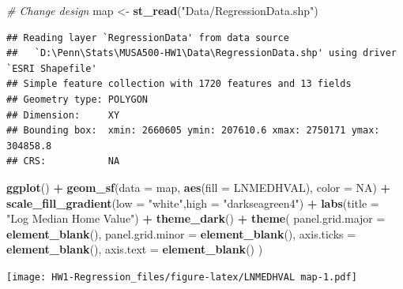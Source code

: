 \documentclass[
]{article}
\newenvironment{Shaded}{\begin{snugshade}}{\end{snugshade}}
\newcommand{\AttributeTok}[1]{\textcolor[rgb]{0.13,0.29,0.53}{#1}}
\newcommand{\CommentTok}[1]{\textcolor[rgb]{0.56,0.35,0.01}{\textit{#1}}}
\newcommand{\ConstantTok}[1]{\textcolor[rgb]{0.56,0.35,0.01}{#1}}
\newcommand{\FunctionTok}[1]{\textcolor[rgb]{0.13,0.29,0.53}{\textbf{#1}}}
\newcommand{\NormalTok}[1]{#1}
\newcommand{\OtherTok}[1]{\textcolor[rgb]{0.56,0.35,0.01}{#1}}
\newcommand{\SpecialCharTok}[1]{\textcolor[rgb]{0.81,0.36,0.00}{\textbf{#1}}}
\newcommand{\StringTok}[1]{\textcolor[rgb]{0.31,0.60,0.02}{#1}}
\begin{document}
\begin{Shaded}
\begin{Highlighting}[]
\CommentTok{\# Change design}
\NormalTok{map }\OtherTok{\textless{}{-}} \FunctionTok{st\_read}\NormalTok{(}\StringTok{"Data/RegressionData.shp"}\NormalTok{)}
\end{Highlighting}
\end{Shaded}

\begin{verbatim}
## Reading layer `RegressionData' from data source 
##   `D:\Penn\Stats\MUSA500-HW1\Data\RegressionData.shp' using driver `ESRI Shapefile'
## Simple feature collection with 1720 features and 13 fields
## Geometry type: POLYGON
## Dimension:     XY
## Bounding box:  xmin: 2660605 ymin: 207610.6 xmax: 2750171 ymax: 304858.8
## CRS:           NA
\end{verbatim}

\begin{Shaded}
\begin{Highlighting}[]
\FunctionTok{ggplot}\NormalTok{() }\SpecialCharTok{+}
  \FunctionTok{geom\_sf}\NormalTok{(}\AttributeTok{data =}\NormalTok{ map, }\FunctionTok{aes}\NormalTok{(}\AttributeTok{fill =}\NormalTok{ LNMEDHVAL), }\AttributeTok{color =} \ConstantTok{NA}\NormalTok{) }\SpecialCharTok{+}
  \FunctionTok{scale\_fill\_gradient}\NormalTok{(}\AttributeTok{low =} \StringTok{"white"}\NormalTok{,}\AttributeTok{high =} \StringTok{"darkseagreen4"}\NormalTok{) }\SpecialCharTok{+}
  \FunctionTok{labs}\NormalTok{(}\AttributeTok{title =} \StringTok{"Log Median Home Value"}\NormalTok{) }\SpecialCharTok{+}
  \FunctionTok{theme\_dark}\NormalTok{() }\SpecialCharTok{+}
  \FunctionTok{theme}\NormalTok{( }
    \AttributeTok{panel.grid.major =} \FunctionTok{element\_blank}\NormalTok{(),}
    \AttributeTok{panel.grid.minor =} \FunctionTok{element\_blank}\NormalTok{(),}
    \AttributeTok{axis.ticks =} \FunctionTok{element\_blank}\NormalTok{(),}
    \AttributeTok{axis.text =} \FunctionTok{element\_blank}\NormalTok{()}
\NormalTok{    )}
\end{Highlighting}
\end{Shaded}

\texttt{[image: HW1-Regression\_files/figure-latex/LNMEDHVAL map-1.pdf]}
\end{document}
